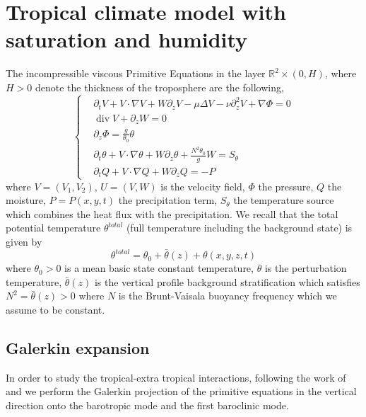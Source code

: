 \documentclass[11pt, a4paper, article,reqno,]{amsart}
\theoremstyle{remark}
\DeclareMathOperator{\dive}{div}
\numberwithin{equation}{section}
\begin{document}
\section{Tropical climate model with saturation and humidity}\label{sec3}

The incompressible viscous Primitive Equations in the layer $\mathbb{R}^2 \times (0,H)$, where $H>0$ denote the thickness of the troposphere are the following,
\begin{equation}\label{pe-lt}
\left\{\begin{aligned}
		& \partial_t V + V \cdot \nabla V + W\partial_z V - \mu \Delta V - \nu \partial_z^2 V + \nabla \Phi =0\\
  & \dive V + \partial_z W = 0 \\
		&  \partial_z \Phi = \frac{g}{\theta_0}\theta \\
	&\partial_t \theta + V \cdot \nabla \theta + W \partial_z \theta + \frac{N^2\theta_0}{g}W = S_{\theta} \\
 &\partial_t Q + V \cdot \nabla Q + W \partial_z Q = - P 
		\end{aligned}\right.
\end{equation}
where $V=(V_1,V_2)$, $U=(V,W)$ is the velocity field, $\Phi$ the pressure, $Q$ the moisture, $P=P(x,y,t)$ the precipitation term, $S_{\theta}$ the temperature source which combines the heat flux with the precipitation. We recall that the total potential temperature $ \theta^{total}$ (full temperature including the background state) is given by
\begin{equation*}
    \theta^{total} = \theta_0 + \bar{\theta}(z) + \theta (x,y,z,t)
\end{equation*}
where $\theta_0>0$ is a mean basic state constant temperature,  $ \theta$ is the perturbation temperature, $\bar{\theta}(z)$ is the vertical profile background stratification which satisfies $N^{2}=\bar{\theta}(z)>0$ where $N$ is the Brunt-Vaisala buoyancy frequency which we assume to be constant. 
\subsection{Galerkin expansion}
In order to study the tropical-extra tropical interactions, following the work of \cite{FM} and \cite{LT} we perform the Galerkin projection of the primitive equations in the vertical direction onto the barotropic mode and the first baroclinic mode. 
\end{document}
